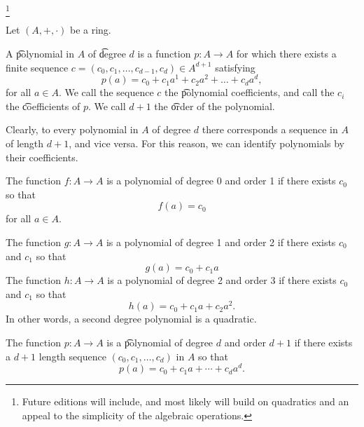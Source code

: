 

\footnote{Future editions will include, and most likely will build on quadratics and an appeal to the simplicity of the  algebraic operations.}


Let $(A, +, \cdot)$ be a ring.


A \t{polynomial} in $A$ of \t{degree} $d$ is a function $p: A \to A$ for which there exists a finite sequence $c = (c_0, c_1, \dots, c_{d-1}, c_d) \in A^{d+1}$ satisfying
\[
	p(a) = c_0 + c_1a^1 + c_2a^2 + \dots + c_da^d,
\]
for all $a \in A$.
We call the sequence $c$ the \t{polynomial coefficients}, and call the $c_i$ the \t{coefficients} of $p$.
We call $d+1$ the \t{order} of the polynomial.

Clearly, to every polynomial in $A$ of degree $d$ there corresponds a sequence in $A$ of length $d+1$, and vice versa.
For this reason, we can identify polynomials by their coefficients.


The function $f: A \to A$ is a polynomial of degree 0 and order 1 if there exists $c_0$ so that
\[
  f(a) = c_0
\]
for all $a \in A$.

The function $g: A \to A$ is a polynomial of degree 1 and order 2 if there exists $c_0$ and $c_1$ so that
\[
  g(a) = c_0 + c_1a
\]
The function $h: A \to A$ is a polynomial of degree 2 and order 3 if there exists $c_0$ and $c_1$ so that
\[
  h(a) = c_0 + c_1a + c_2a^2.
\]
In other words, a second degree polynomial is a quadratic.

The function $p: A \to A$ is a \t{polynomial} of degree $d$ and order $d+1$ if there exists a $d+1$ length sequence $(c_0, c_1, \dots, c_d)$ in $A$ so that
\[
  p(a) = c_0 + c_1a + \cdots + c_da^d.
\]

